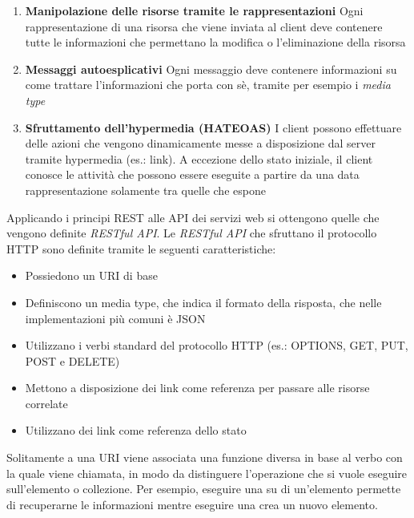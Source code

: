 \begin{itemize}
\begin{enumerate}
		\item \textbf{Manipolazione delle risorse tramite le rappresentazioni} Ogni rappresentazione di una risorsa che viene inviata al client deve contenere tutte le informazioni che permettano la modifica o l'eliminazione della risorsa
		\item \textbf{Messaggi autoesplicativi} Ogni messaggio deve contenere informazioni su come trattare l'informazioni che porta con sè, tramite per esempio i \emph{media type}
		\item \textbf{Sfruttamento dell'hypermedia (HATEOAS)} I client possono effettuare delle azioni che vengono dinamicamente messe a disposizione dal server tramite hypermedia (es.: link). A eccezione dello stato iniziale, il client conosce le attività che possono essere eseguite a partire da una data rappresentazione solamente tra quelle che espone
	\end{enumerate}
\end{itemize}

Applicando i principi REST alle API dei servizi web si ottengono quelle che vengono definite \emph{RESTful API}. Le \emph{RESTful API} che sfruttano il protocollo HTTP sono definite tramite le seguenti caratteristiche:

\begin{itemize}
	\item Possiedono un URI di base
	\item Definiscono un media type, che indica il formato della risposta, che nelle implementazioni più comuni è JSON
	\item Utilizzano i verbi standard del protocollo HTTP (es.: OPTIONS, GET, PUT, POST e DELETE)
	\item Mettono a disposizione dei link come referenza per passare alle risorse correlate
	\item Utilizzano dei link come referenza dello stato
\end{itemize}

Solitamente a una URI viene associata una funzione diversa in base al verbo con la quale viene chiamata, in modo da distinguere l'operazione che si vuole eseguire sull'elemento o collezione. Per esempio, eseguire una  su di un'elemento permette di recuperarne le informazioni mentre eseguire una  crea un nuovo elemento.

